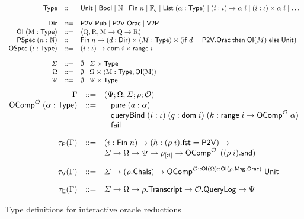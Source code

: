 \begin{figure}[t]
    \[\begin{array}{rcl}
        \mathsf{Type} &::=& \mathsf{Unit} \mid \mathsf{Bool} \mid \mathbb{N} \mid \mathsf{Fin}\; n \mid \mathbb{F}_q \mid \mathsf{List}\;(\alpha : \mathsf{Type}) \mid (i : \iota) \to \alpha\; i \mid (i : \iota) \times \alpha\; i \mid \dots \\[1em]
        \mathsf{Dir} &::=& \mathsf{P2V.Pub} \mid \mathsf{P2V.Orac} \mid \mathsf{V2P} \\
        \mathsf{OI}\; (\mathrm{M} : \mathsf{Type}) &::=& \langle \mathrm{Q}, \mathrm{R}, \mathrm{M} \to \mathrm{Q} \to \mathrm{R} \rangle \\
        \mathsf{PSpec}\; (n : \mathbb{N}) &::=& \mathsf{Fin}\; n \to (d : \mathsf{Dir}) \times (M : \mathsf{Type}) \times (\mathsf{if}\; d = \mathsf{P2V.Orac} \; \mathsf{then} \; \mathsf{OI}(M) \; \mathsf{else} \; \mathsf{Unit}) \\
        \mathsf{OSpec} \; (\iota : \mathsf{Type}) &::=& (i : \iota) \to \mathsf{dom}\; i \times \mathsf{range}\; i \\[1em]
        \varSigma &::=& \emptyset \mid \varSigma \times \mathsf{Type} \\
        \Omega &::=& \emptyset \mid \Omega \times \langle \mathrm{M} : \mathsf{Type}, \mathsf{OI}(\mathrm{M}) \rangle \\
        \Psi &::=& \emptyset \mid \Psi \times \mathsf{Type}\\
    \end{array}\]
    \[\begin{array}{rcl}
        \Gamma &::=& (\Psi; \Omega; \varSigma; \rho; \mathcal{O})\\
        \mathsf{OComp}^{\mathcal{O}}\; (\alpha : \mathsf{Type}) &::=& \mid\; \mathsf{pure}\; (a : \alpha) \\
        && \mid\; \mathsf{queryBind}\;(i : \iota)\; (q : \mathsf{dom}\; i)\; (k : \mathsf{range}\; i \to \mathsf{OComp}^{\mathcal{O}}\; \alpha) \\
        && \mid\; \mathsf{fail} \\[1em]
        \tau_{\mathsf{P}}(\Gamma) &::=& (i : \mathsf{Fin}\; n) \to (h : (\rho \; i).\mathsf{fst} = \mathsf{P2V}) \to \\
        && \varSigma \to \Omega \to \Psi \to \rho_{[:i]} \to \mathsf{OComp}^{\mathcal{O}}\;\left( (\rho \; i).\mathsf{snd}\right) \\[1em]

        \tau_{\mathsf{V}}(\Gamma) &::=& \varSigma \to (\rho.\mathsf{Chals}) \to \mathsf{OComp}^{\mathcal{O} :: \mathsf{OI}(\Omega) :: \mathsf{OI}(\rho.\mathsf{Msg.Orac})}\; \mathsf{Unit} \\[1em]
        \tau_{\mathsf{E}}(\Gamma) &::=& \varSigma \to \Omega \to \rho.\mathsf{Transcript} \to \mathcal{O}.\mathsf{QueryLog} \to \Psi
    \end{array}\]
    \caption{Type definitions for interactive oracle reductions}
    \label{fig:type-defs}
\end{figure}

